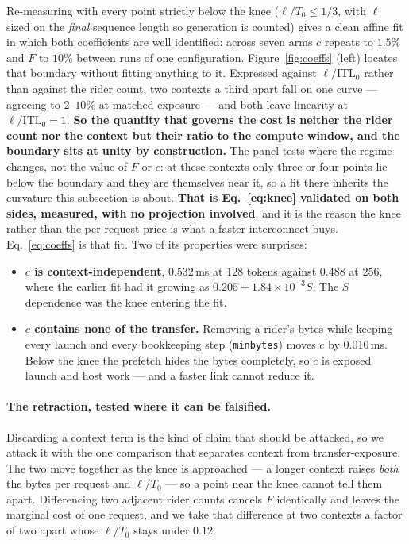 Re-measuring with every point strictly below the knee ($\ell/T_0 \le 1/3$, with
$\ell$ sized on the \emph{final} sequence length so generation is counted) gives a
clean affine fit in which both coefficients are well identified: across seven arms
$c$ repeats to $1.5\%$ and $F$ to $10\%$ between runs of one configuration.
Figure~\ref{fig:coeffs} (left) locates that boundary without fitting anything to
it. Expressed against $\ell/\mathrm{ITL}_0$ rather than against the rider count, two
contexts a third apart fall on one curve --- agreeing to $2$--$10\%$ at matched
exposure --- and both leave linearity at $\ell/\mathrm{ITL}_0 = 1$. \textbf{So the
quantity that governs the cost is neither the rider count nor the context but their
ratio to the compute window, and the boundary sits at unity by construction.} The
panel tests where the regime changes, not the value of $F$ or $c$: at these
contexts only three or four points lie below the boundary and they are themselves
near it, so a fit there inherits the curvature this subsection is about. \textbf{That is
Eq.~\ref{eq:knee} validated on both sides, measured, with no projection involved},
and it is the reason the knee rather than the per-request price is what a faster
interconnect buys.
Eq.~\ref{eq:coeffs} is that fit. Two of its properties were surprises:

\begin{itemize}\itemsep1pt \parskip0pt
\item \textbf{$c$ is context-independent}, $0.532$\,ms at $128$ tokens against
  $0.488$ at $256$, where the earlier fit had it growing as
  $0.205 + 1.84\times10^{-3}S$. The $S$ dependence was the knee entering the fit.
\item \textbf{$c$ contains none of the transfer.} Removing a rider's bytes while
  keeping every launch and every bookkeeping step (\texttt{minbytes}) moves $c$ by
  $0.010$\,ms. Below the knee the prefetch hides the bytes completely, so $c$ is
  exposed launch and host work --- and a faster link cannot reduce it.
\end{itemize}

\paragraph{The retraction, tested where it can be falsified.}
Discarding a context term is the kind of claim that should be attacked, so we attack
it with the one comparison that separates context from transfer-exposure. The two
move together as the knee is approached --- a longer context raises
\emph{both} the bytes per request and $\ell/T_0$ --- so a point near the knee cannot
tell them apart. Differencing two adjacent rider counts cancels $F$ identically and
leaves the marginal cost of one request, and we take that difference at two contexts
a factor of two apart whose $\ell/T_0$ stays under $0.12$:


